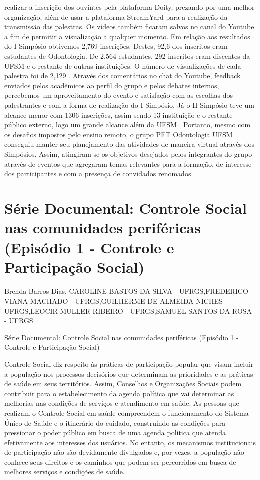 realizar a inscrição dos ouvintes pela plataforma Doity, prezando por uma melhor organização,
além de usar a plataforma StreamYard para a realização da transmissão das palestras. Os vídeos
também ficaram salvos no canal do Youtube a fim de permitir a visualização a qualquer
momento. Em relação aos resultados do I Simpósio obtivemos 2,769 inscrições. Destes, 92,6%
dos inscritos eram estudantes de Odontologia. De 2,564 estudantes, 292 inscritos eram discentes
da UFSM e o restante de outras instituições. O número de visualizações de cada palestra foi de
2,129 . Através dos comentários no chat do Youtube, feedback enviados pelos acadêmicos ao
perfil do grupo e pelos debates internos, percebemos um aproveitamento do evento e satisfação
com as escolhas dos palestrantes e com a forma de realização do I Simpósio. Já o II Simpósio
teve um alcance menor com 1306 inscrições, assim sendo 13%
instituição e o restante público externo, logo um grande alcance além da UFSM . Portanto,
mesmo com os desafios impostos pelo ensino remoto, o grupo PET Odontologia UFSM
conseguiu manter seu planejamento das atividades de maneira virtual através dos Simpósios.
Assim, atingiram-se os objetivos desejados pelos integrantes do grupo através de eventos que
agregaram temas relevantes para a formação, de interesse dos participantes e com a presença de
convidados renomados.



\section{Série Documental: Controle Social nas comunidades periféricas  (Episódio 1 - Controle e Participação Social)}

Brenda Barros Dias, CAROLINE BASTOS DA SILVA - UFRGS,FREDERICO VIANA MACHADO - UFRGS,GUILHERME DE ALMEIDA NICHES - UFRGS,LEOCIR MULLER RIBEIRO - UFRGS,SAMUEL SANTOS DA ROSA - UFRGS

Série Documental: Controle Social nas comunidades periféricas  (Episódio 1 - Controle e Participação Social)

Controle Social diz respeito às práticas de participação popular que visam incluir a população nos processos decisórios que determinam as prioridades e as práticas de saúde em seus territórios. Assim, Conselhos e Organizações Sociais podem contribuir para o estabelecimento da agenda política que vai determinar as melhorias nas condições de serviços e atendimento em saúde. As pessoas que realizam o Controle Social em saúde compreendem o funcionamento do Sistema Único de Saúde e o itinerário do cuidado, construindo as condições para pressionar o poder público em busca de uma agenda política que atenda efetivamente aos interesses dos usuários. No entanto, os mecanismos institucionais de participação não são devidamente divulgados e, por vezes, a população não conhece seus direitos e os caminhos que podem ser percorridos em busca de melhores serviços e condições de saúde. 

